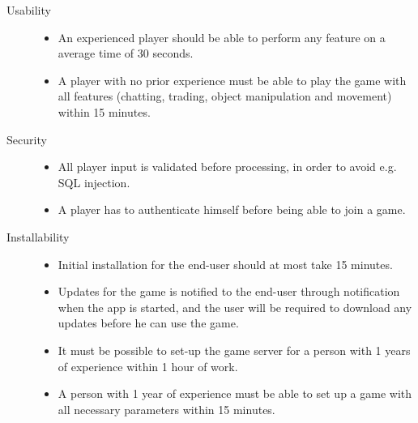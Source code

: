 \begin{description}
\item [Usability] \hfill 
	\begin{itemize}
		\item An experienced player should be able to perform any feature on a average time of 30 seconds. 
		\item A player with no prior experience must be able to play the game with all features (chatting, trading, object manipulation and movement) within 15 minutes.
	\end{itemize}

\item[Security] \hfill 
	\begin{itemize}
		\item All player input is validated before processing, in order to avoid e.g. SQL injection.
		\item A player has to authenticate himself before being able to join a game. 
	\end{itemize}

 

\item[Installability] \hfill 
	\begin{itemize}
	     \item Initial installation for the end-user should at most take 15 minutes. 
	     \item Updates for the game is notified to the end-user through notification when the app is started, and the user will be required to download any updates before he can use the game.
	     \item It must be possible to set-up the game server for a person with 1 years of experience within 1 hour of work. 
	     \item A person with 1 year of experience must be able to set up a game with all necessary parameters within 15 minutes. 
	\end{itemize}

 
\end{description}
